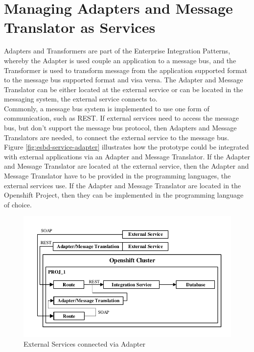 \section{Managing Adapters and Message Translator as Services}
\label{sec:esbd-adap-trans-service}
Adapters and Transformers are part of the Enterprise Integration Patterns, whereby the Adapter is used couple an application to a message bus, and the Transformer is used to transform message from the application supported format to the message bus supported format and visa versa. The Adapter and Message Translator can be either located at the external service or can be located in the messaging system, the external service connects to. \\

Commonly, a message bus system is implemented to use one form of communication, such as REST. If external services need to access the message bus, but don't support the message bus protocol, then Adapters and Message Translators are needed, to connect the external service to the message bus. \\

Figure \vref{fig:esbd-service-adapter} illustrates how the prototype could be integrated with external applications via an Adapter and Message Translator. If the Adapter and Message Translator are located at the external service, then the Adapter and Message Translator have to be provided in the programming languages, the external services use. If the Adapter and Message Translator are located in the Openshift Project, then they can be implemented in the programming language of choice.

\begin{figure}[htbp]
	\centering
	\includegraphics[scale=1]{images/esbd-service-adapter.pdf}
	\caption{External Services connected via Adapter}
	\label{fig:esbd-service-adapter}
\end{figure}

